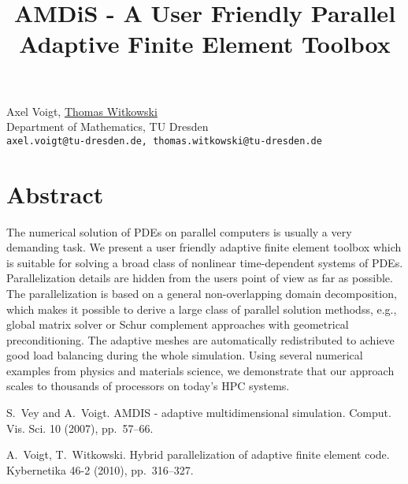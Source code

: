 \title{AMDiS - A User Friendly Parallel Adaptive Finite Element Toolbox}
\author{} \institute{}
\maketitle

\begin{center}
{\large Axel Voigt, \underline{Thomas Witkowski}}\\
Department of Mathematics, TU Dresden\\
{\tt axel.voigt@tu-dresden.de, thomas.witkowski@tu-dresden.de}
\end{center}

\section*{Abstract}
The numerical solution of PDEs on parallel computers is usually a very demanding task. We present a user friendly adaptive finite element toolbox which is suitable for solving a broad class of nonlinear time-dependent systems of PDEs. Parallelization details are hidden from the users point of view as far as possible. The parallelization is based on a general non-overlapping domain decomposition, which makes it possible to derive a large class of parallel solution methodss, e.g., global matrix solver or Schur complement approaches with geometrical preconditioning. The adaptive meshes are automatically redistributed to achieve good load balancing during the whole simulation.  Using several numerical examples from physics and materials science, we demonstrate that our approach scales to thousands of processors on today's HPC systems.


\begin{thebibliography}{10}
{S.~Vey and A.~Voigt}. {AMDIS - adaptive multidimensional simulation}. Comput. Vis. Sci. 10 (2007), pp.~57--66.

{A.~Voigt, T.~Witkowski}. {Hybrid parallelization of adaptive finite element code}. Kybernetika 46-2 (2010), pp.~316--327.
\end{thebibliography}
